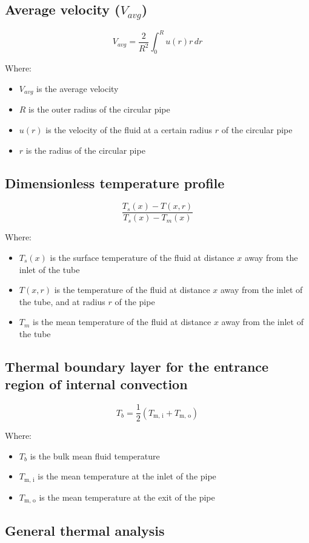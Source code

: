 \documentclass[11pt]{article}
\begin{document}
\subsection{Average velocity (\(V_{avg}\))}
\label{sec:orgfbabaa1}
\[V_{avg} = \frac{2}{R^2} \int_0^R u(r) r \, dr\]

Where:
\begin{itemize}
\item \(V_{avg}\) is the average velocity
\item \(R\) is the outer radius of the circular pipe
\item \(u(r)\) is the velocity of the fluid at a certain radius \(r\) of the circular pipe
\item \(r\) is the radius of the circular pipe
\end{itemize}
\subsection{Dimensionless temperature profile}
\label{sec:orga34599a}
\[\frac{T_s (x) - T(x, r)}{T_s (x) - T_m (x)}\]

Where:
\begin{itemize}
\item \(T_s(x)\) is the surface temperature of the fluid at distance \(x\) away from the inlet of the tube
\item \(T(x, r)\) is the temperature of the fluid at distance \(x\) away from the inlet of the tube, and at radius \(r\) of the pipe
\item \(T_m\) is the mean temperature of the fluid at distance \(x\) away from the inlet of the tube
\end{itemize}
\subsection{Thermal boundary layer for the entrance region of internal convection}
\label{sec:org9425e32}
\[T_b = \frac{1}{2} (T_{\text{m, i}} + T_{\text{m, o}})\]

Where:
\begin{itemize}
\item \(T_b\) is the bulk mean fluid temperature
\item \(T_{\text{m, i}}\) is the mean temperature at the inlet of the pipe
\item \(T_{\text{m, o}}\) is the mean temperature at the exit of the pipe
\end{itemize}
\subsection{General thermal analysis}
\label{sec:org8c3398e}
\end{document}
